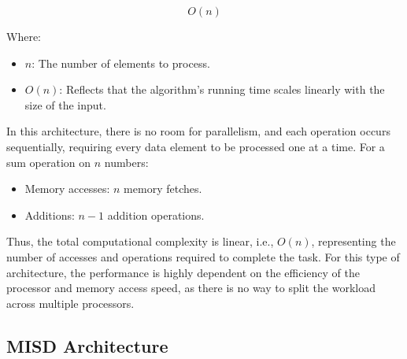 \documentclass[a4paper, 10pt]{book}
\begin{document}
                $$O(n)$$

                Where:

                \begin{itemize}
                    
                    \item $n$: The number of elements to process.

                    \item $O(n)$: Reflects that the algorithm's running time scales linearly with the size of the input.

                \end{itemize}

                In this architecture, there is no room for parallelism, and each operation occurs sequentially, requiring every data element to be processed one at a time. For a sum operation on $n$ numbers:

                \begin{itemize}

                    \item Memory accesses: $n$ memory fetches.
                    \item Additions: $n−1$ addition operations.

                \end{itemize}

                Thus, the total computational complexity is linear, i.e., $O(n)$, representing the number of accesses and operations required to complete the task. For this type of architecture, the performance is highly dependent on the efficiency of the processor and memory access speed, as there is no way to split the workload across multiple processors.
                
            \subsection{MISD Architecture}
\end{document}
